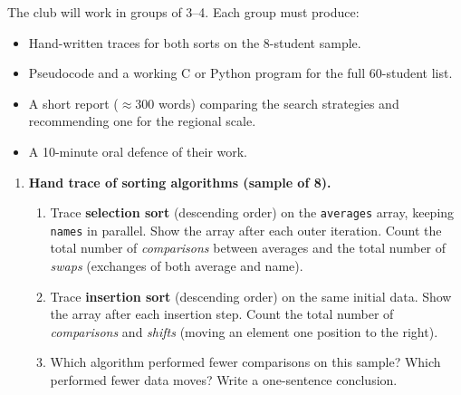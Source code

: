 \documentclass[11pt]{article}
\newcounter{popsec}
\newcounter{popsub}
\newcommand{\courssub}[1]{%
  \stepcounter{popsub}%
  \par\vspace{9pt}\noindent{\popxbold\fontsize{11.5}{13}\selectfont\color{popink}{\color{poporange}\thepopsec.\thepopsub}\hspace{6pt}#1}\par\nopagebreak\vspace{4pt}
}
\begin{document}
\begin{experience}
The club will work in groups of 3--4. Each group must produce:
\begin{itemize}
    \item Hand-written traces for both sorts on the 8-student sample.
    \item Pseudocode and a working C or Python program for the full 60-student list.
    \item A short report ($\approx$300 words) comparing the search strategies and recommending one for the regional scale.
    \item A 10-minute oral defence of their work.
\end{itemize}
\end{experience}

\courssub{Tasks}
\begin{enumerate}
    \item \textbf{Hand trace of sorting algorithms (sample of 8).}
    \begin{enumerate}
        \item Trace \textbf{selection sort} (descending order) on the \texttt{averages} array, keeping \texttt{names} in parallel. Show the array after each outer iteration. Count the total number of \emph{comparisons} between averages and the total number of \emph{swaps} (exchanges of both average and name).
        \item Trace \textbf{insertion sort} (descending order) on the same initial data. Show the array after each insertion step. Count the total number of \emph{comparisons} and \emph{shifts} (moving an element one position to the right).
        \item Which algorithm performed fewer comparisons on this sample? Which performed fewer data moves? Write a one-sentence conclusion.
    \end{enumerate}


\end{enumerate}
\end{document}
